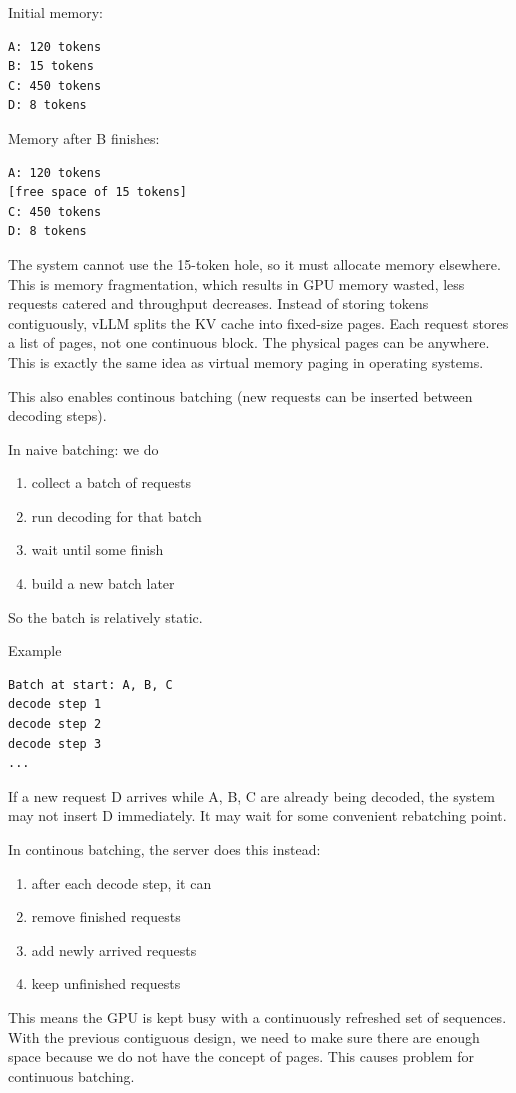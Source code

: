 \documentclass[11pt]{article}  %
\begin{document}
Initial memory:
\begin{verbatim}
A: 120 tokens
B: 15 tokens
C: 450 tokens
D: 8 tokens  
\end{verbatim}

Memory after B finishes:
\begin{verbatim}
A: 120 tokens
[free space of 15 tokens]
C: 450 tokens
D: 8 tokens
\end{verbatim}
The system cannot use the 15-token hole, so it must allocate memory elsewhere. 
This is memory fragmentation, which results in GPU memory wasted, less requests catered and throughput decreases.
Instead of storing tokens contiguously, vLLM splits the KV cache into fixed-size pages.
Each request stores a list of pages, not one continuous block.
The physical pages can be anywhere.
This is exactly the same idea as virtual memory paging in operating systems.

This also enables continous batching (new requests can be inserted between decoding steps).

In naive batching: we do 
\begin{enumerate}
  \item collect a batch of requests
  \item run decoding for that batch
  \item wait until some finish
  \item build a new batch later
\end{enumerate}
So the batch is relatively static.

Example
\begin{verbatim}
Batch at start: A, B, C
decode step 1
decode step 2
decode step 3
...
\end{verbatim}
If a new request D arrives while A, B, C are already being decoded, the system may not insert D immediately. It may wait for some convenient rebatching point.

In continous batching, the server does this instead:
\begin{enumerate}
  \item after each decode step, it can
  \item remove finished requests
  \item add newly arrived requests
  \item keep unfinished requests
\end{enumerate}
This means the GPU is kept busy with a continuously refreshed set of sequences.
With the previous contiguous design, we need to make sure there are enough space because we do not have the concept of pages. 
This causes problem for continuous batching. 
\end{document}
